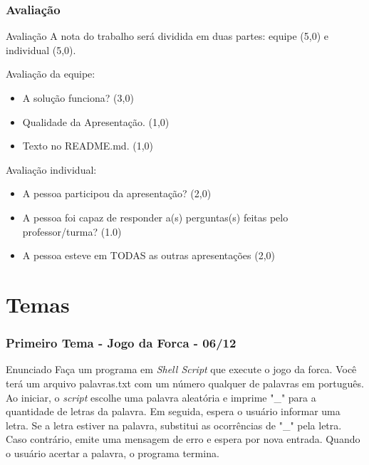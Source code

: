 \documentclass{beamer}
\begin{document}
   \begin{frame}
      \frametitle{Avaliação}
      \begin{block}{Avaliação}
      A nota do trabalho será dividida em duas partes: equipe (5,0) e individual (5,0).
      \end{block}
	
      \begin{block}{Avaliação da equipe: }
      \begin{itemize}
         \item A solução funciona? (3,0)
	 \item Qualidade da Apresentação. (1,0)
	 \item Texto no README.md. (1,0)
      \end{itemize}
      \end{block}
	
      \begin{block}{Avaliação individual: }
      \begin{itemize}
         \item A pessoa participou da apresentação? (2,0)
	 \item A pessoa foi capaz de responder a(s) perguntas(s) feitas pelo professor/turma? (1.0)
	 \item A pessoa esteve em TODAS as outras apresentações (2,0)
      \end{itemize}
      \end{block}
   \end{frame}

   \section{Temas}

   \begin{frame}
      \frametitle{Primeiro Tema - Jogo da Forca - 06/12}
      \begin{block}{Enunciado}
      Faça um programa em \textit{Shell Script} que execute o jogo da forca. Você terá um arquivo palavras.txt com um número qualquer de palavras em português. Ao iniciar, o \textit{script} escolhe uma palavra aleatória e imprime "\_" para a quantidade de letras da palavra. Em seguida, espera o usuário informar uma letra. Se a letra estiver na palavra, substitui as ocorrências de "\_" pela letra. Caso contrário, emite uma mensagem de erro e espera por nova entrada. Quando o usuário acertar a palavra, o programa termina.
      \end{block}
   \end{frame}
\end{document}

